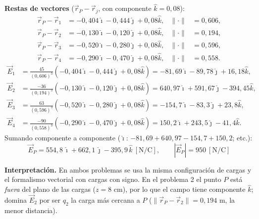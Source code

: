 \documentclass[12pt,letterpaper]{article}
\begin{document}
\medskip
\noindent\textbf{Restas de vectores} ($\vec r_P-\vec r_j$, con componente $\hat k=0{,}08$):
\begin{align*}
    \vec r_P-\vec r_1 &= -0{,}404\hat\imath-0{,}444\hat\jmath+0{,}08\hat k, & \lVert\cdot\rVert&=0{,}606,\\
    \vec r_P-\vec r_2 &= -0{,}130\hat\imath-0{,}120\hat\jmath+0{,}08\hat k, & \lVert\cdot\rVert&=0{,}194,\\
    \vec r_P-\vec r_3 &= -0{,}520\hat\imath-0{,}280\hat\jmath+0{,}08\hat k, & \lVert\cdot\rVert&=0{,}596,\\
    \vec r_P-\vec r_4 &= -0{,}290\hat\imath-0{,}470\hat\jmath+0{,}08\hat k, & \lVert\cdot\rVert&=0{,}558.
\end{align*}
\begin{align*}
    \vec E_1 &= \tfrac{45}{(0{,}606)^3}(-0{,}404\hat\imath-0{,}444\hat\jmath+0{,}08\hat k) = -81{,}69\hat\imath-89{,}78\hat\jmath+16{,}18\hat k,\\
    \vec E_2 &= \tfrac{-36}{(0{,}194)^3}(-0{,}130\hat\imath-0{,}120\hat\jmath+0{,}08\hat k) = 640{,}97\hat\imath+591{,}67\hat\jmath-394{,}45\hat k,\\
    \vec E_3 &= \tfrac{63}{(0{,}596)^3}(-0{,}520\hat\imath-0{,}280\hat\jmath+0{,}08\hat k) = -154{,}7\hat\imath-83{,}3\hat\jmath+23{,}8\hat k,\\
    \vec E_4 &= \tfrac{-90}{(0{,}558)^3}(-0{,}290\hat\imath-0{,}470\hat\jmath+0{,}08\hat k) = 150{,}2\hat\imath+243{,}5\hat\jmath-41{,}4\hat k.
\end{align*}
Sumando componente a componente ($\hat\imath$: $-81{,}69+640{,}97-154{,}7+150{,}2$; etc.):
\[
    \boxed{\vec E_P = 554{,}8\,\hat\imath + 662{,}1\,\hat\jmath - 395{,}9\,\hat k\ [\text{N/C}],\qquad
    |\vec E_P| = 950\ [\text{N/C}]}
\]

\noindent\textbf{Interpretaci\'on.} En ambos problemas se usa la misma configuraci\'on de cargas y el
formalismo vectorial con cargas con signo. En el problema 2 el punto $P$ est\'a \emph{fuera} del plano
de las cargas ($z=8$ cm), por lo que el campo tiene componente $\hat k$; domina $\vec E_2$ por ser $q_2$
la carga m\'as cercana a $P$ ($\lVert\vec r_P-\vec r_2\rVert=0{,}194$ m, la menor distancia).
\end{document}
